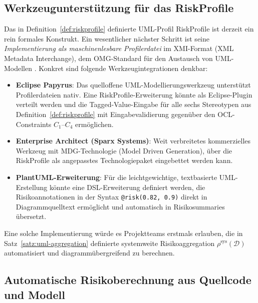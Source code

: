 ﻿\documentclass[a4paper,12pt]{article}
\theoremstyle{definition}
\begin{document}
\subsection{Werkzeugunterst\"utzung f\"ur das \textsf{RiskProfile}}

Das in Definition~\ref{def:riskprofile} definierte UML-Profil \textsf{RiskProfile}
ist derzeit ein rein formales Konstrukt. Ein wesentlicher n\"achster Schritt ist seine
\emph{Implementierung als maschinenlesbare Profilerdatei} im XMI-Format (XML Metadata
Interchange), dem OMG-Standard f\"ur den Austausch von UML-Modellen \cite{omg2017}.
Konkret sind folgende Werkzeugintegrationen denkbar:

\begin{itemize}
    \item \textbf{Eclipse Papyrus}: Das quelloffene UML-Modellierungswerkzeug
          unterst\"utzt Profilerdateien nativ. Eine \textsf{RiskProfile}-Erweiterung
          k\"onnte als Eclipse-Plugin verteilt werden und die Tagged-Value-Eingabe
          f\"ur alle sechs Stereotypen aus Definition~\ref{def:riskprofile} mit
          Eingabevalidierung gegen\"uber den OCL-Constraints $C_1$--$C_4$ erm\"oglichen.
    \item \textbf{Enterprise Architect (Sparx Systems)}: Weit verbreitetes kommerzielles
          Werkzeug mit MDG-Technologie (Model Driven Generation), \"uber die
          \textsf{RiskProfile} als angepasstes Technologiepaket eingebettet werden kann.
    \item \textbf{PlantUML-Erweiterung}: F\"ur die leichtgewichtige,
          textbasierte UML-Erstellung k\"onnte eine DSL-Erweiterung definiert werden,
          die Risikoannotationen in der Syntax \texttt{@risk(0.82, 0.9)} direkt in
          Diagrammquelltext erm\"oglicht und automatisch in Risikosummaries \"ubersetzt.
\end{itemize}

Eine solche Implementierung w\"urde es Projektteams erstmals erlauben, die in
Satz~\ref{satz:uml-aggregation} definierte systemweite Risikoaggregation
$\rho^{\mathrm{sys}}(\mathcal{D})$ automatisiert und diagramm\"ubergreifend zu berechnen.

\subsection{Automatische Risikoberechnung aus Quellcode und Modell}
\end{document}
